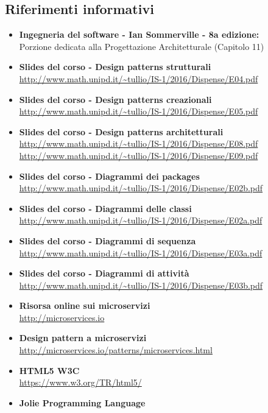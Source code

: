 \subsection{Riferimenti informativi}
\begin{itemize}
	\item \textbf{Ingegneria del software - Ian Sommerville - 8a edizione:}\\
	Porzione dedicata alla Progettazione Architetturale (Capitolo 11)
	\item \textbf{Slides del corso - Design patterns strutturali}\\
	\url{http://www.math.unipd.it/~tullio/IS-1/2016/Dispense/E04.pdf}
	\item \textbf{Slides del corso - Design patterns creazionali}\\
	\url{http://www.math.unipd.it/~tullio/IS-1/2016/Dispense/E05.pdf}
	\item \textbf{Slides del corso - Design patterns architetturali}\\
	\url{http://www.math.unipd.it/~tullio/IS-1/2016/Dispense/E08.pdf}\\
	\url{http://www.math.unipd.it/~tullio/IS-1/2016/Dispense/E09.pdf}
	\item \textbf{Slides del corso - Diagrammi dei packages}\\
	\url{http://www.math.unipd.it/~tullio/IS-1/2016/Dispense/E02b.pdf}
	\item \textbf{Slides del corso - Diagrammi delle classi}\\
	\url{http://www.math.unipd.it/~tullio/IS-1/2016/Dispense/E02a.pdf}
	\item \textbf{Slides del corso - Diagrammi di sequenza}\\
	\url{http://www.math.unipd.it/~tullio/IS-1/2016/Dispense/E03a.pdf}
	\item \textbf{Slides del corso - Diagrammi di attività}\\
	\url{http://www.math.unipd.it/~tullio/IS-1/2016/Dispense/E03b.pdf}
	\item \textbf{Risorsa online sui microservizi}\\
	\url{http://microservices.io}
	\item \textbf{Design pattern a microservizi}\\
	\url{http://microservices.io/patterns/microservices.html}
	\item \textbf{HTML5 W3C}\\
	\url{https://www.w3.org/TR/html5/}
	\item \textbf{Jolie Programming Language}\\

\end{itemize}
